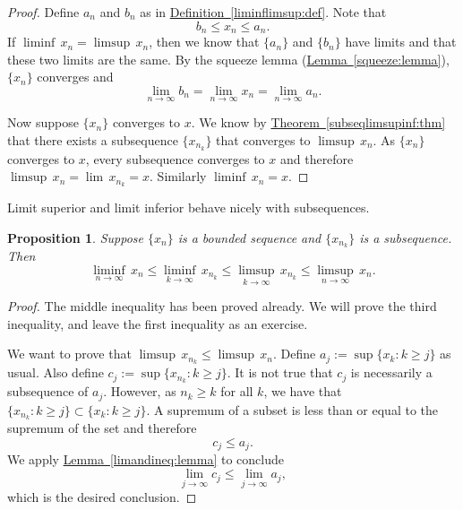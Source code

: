 \documentclass[12pt]{book}
\theoremstyle{plain}
\newtheorem{prop}[thm]{Proposition}
\theoremstyle{remark}
\theoremstyle{definition}
\theoremstyle{exercise}
\theoremstyle{example}
\newcommand{\thmref}[1]{\hyperref[#1]{Theorem~\ref*{#1}}}
\newcommand{\lemmaref}[1]{\hyperref[#1]{Lemma~\ref*{#1}}}
\newcommand{\defnref}[1]{\hyperref[#1]{Definition~\ref*{#1}}}
\begin{document}
\begin{proof}
Define $a_n$ and $b_n$ as in \defnref{liminflimsup:def}.
Note that
\begin{equation*}
b_n \leq x_n \leq a_n .
\end{equation*}
If 
$\liminf \, x_n = \limsup \, x_n$, then we know that $\{ a_n \}$ and $\{ b_n \}$
have limits and that these two limits are the same.  By the squeeze lemma
(\lemmaref{squeeze:lemma}), $\{ x_n \}$ converges and
\begin{equation*}
\lim_{n\to \infty} b_n
=
\lim_{n\to \infty} x_n
=
\lim_{n\to \infty} a_n .
\end{equation*}

Now suppose $\{ x_n \}$ converges to $x$.
We know by
\thmref{subseqlimsupinf:thm}
that there exists a subsequence $\{ x_{n_k} \}$
that converges to $\limsup \, x_n$.
As $\{ x_n \}$ converges to $x$,
every subsequence converges to $x$ and
therefore $\limsup \, x_n = \lim\, x_{n_k} = x$.  Similarly $\liminf \, x_n = x$.
\end{proof}

Limit superior and limit inferior behave nicely
with subsequences.

\begin{prop} \label{prop:subseqslimsupinf}
Suppose $\{ x_n \}$ is a bounded sequence and
$\{ x_{n_k} \}$ is a subsequence.  Then
\begin{equation*}
\liminf_{n\to\infty} \, x_n \leq
\liminf_{k\to\infty} \, x_{n_k} \leq
\limsup_{k\to\infty} \, x_{n_k} \leq
\limsup_{n\to\infty} \, x_n .
\end{equation*}
\end{prop}

\begin{proof}
The middle inequality has been proved already.  We will prove the third
inequality, and leave the first inequality as an exercise.

We want to prove that
$\limsup \, x_{n_k} \leq \limsup \, x_n$.  Define
$a_j := \sup \{ x_k : k \geq j \}$ 
as usual.
Also define
$c_j := \sup \{ x_{n_k} : k \geq j \}$.
It is not true that $c_j$ is necessarily a subsequence of $a_j$.  However,
as $n_k \geq k$ for all $k$, we have that
$\{ x_{n_k} : k \geq j \} \subset \{ x_k : k \geq j \}$.
A supremum of a subset is less than or equal to the supremum of the
set and therefore
\begin{equation*}
c_j \leq a_j .
\end{equation*}
We apply \lemmaref{limandineq:lemma} to conclude 
\begin{equation*}
\lim_{j\to\infty} c_j \leq \lim_{j\to\infty} a_j ,
\end{equation*}
which is the desired conclusion.
\end{proof}
\end{document}
